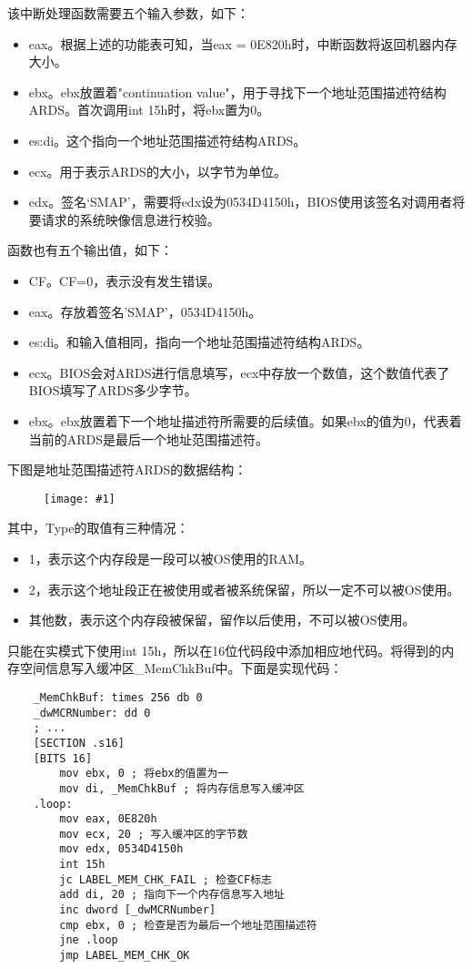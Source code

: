 \documentclass[a4paper,left=2.5cm,right=2.5cm,11pt]{article}
\newcommand{\fic}[1]{\begin{figure}[H]
		\center
		\texttt{[image: \#1]}
	\end{figure}}
\begin{document}
	该中断处理函数需要五个输入参数，如下：
	\begin{itemize}
		\item eax。根据上述的功能表可知，当eax = 0E820h时，中断函数将返回机器内存大小。
		\item ebx。ebx放置着"continuation value"，用于寻找下一个地址范围描述符结构ARDS。首次调用int 15h时，将ebx置为0。
		\item es:di。这个指向一个地址范围描述符结构ARDS。
		\item ecx。用于表示ARDS的大小，以字节为单位。
		\item edx。签名‘SMAP’，需要将edx设为0534D4150h，BIOS使用该签名对调用者将要请求的系统映像信息进行校验。
	\end{itemize}

	函数也有五个输出值，如下：
	\begin{itemize}
		\item CF。CF=0，表示没有发生错误。
		\item eax。存放着签名'SMAP'，0534D4150h。
		\item es:di。和输入值相同，指向一个地址范围描述符结构ARDS。
		\item ecx。BIOS会对ARDS进行信息填写，ecx中存放一个数值，这个数值代表了BIOS填写了ARDS多少字节。
		\item ebx。ebx放置着下一个地址描述符所需要的后续值。如果ebx的值为0，代表着当前的ARDS是最后一个地址范围描述符。
	\end{itemize}

	下图是地址范围描述符ARDS的数据结构：
	\fic{7.png}

	其中，Type的取值有三种情况：
	\begin{itemize}
		\item 1，表示这个内存段是一段可以被OS使用的RAM。
		\item 2，表示这个地址段正在被使用或者被系统保留，所以一定不可以被OS使用。
		\item 其他数，表示这个内存段被保留，留作以后使用，不可以被OS使用。
	\end{itemize}

	只能在实模式下使用int 15h，所以在16位代码段中添加相应地代码。将得到的内存空间信息写入缓冲区\_MemChkBuf中。下面是实现代码：
	\begin{lstlisting}
	_MemChkBuf: times 256 db 0
	_dwMCRNumber: dd 0
	; ...
	[SECTION .s16]
	[BITS 16]
		mov ebx, 0 ; 将ebx的值置为一
		mov di, _MemChkBuf ; 将内存信息写入缓冲区
	.loop:
		mov eax, 0E820h
		mov ecx, 20 ; 写入缓冲区的字节数
		mov edx, 0534D4150h
		int 15h
		jc LABEL_MEM_CHK_FAIL ; 检查CF标志
		add di, 20 ; 指向下一个内存信息写入地址
		inc dword [_dwMCRNumber]
		cmp ebx, 0 ; 检查是否为最后一个地址范围描述符
		jne .loop
		jmp LABEL_MEM_CHK_OK
	\end{lstlisting}
\end{document}
